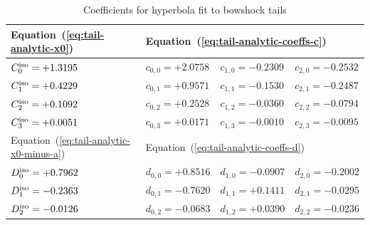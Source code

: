 \begin{table}
  \caption{Coefficients for hyperbola fit to bowshock tails}
  \label{tab:tail-fit-coeffs}
  \renewcommand\arraystretch{1.2}
  \setlength\tabcolsep{0.5\tabcolsep}
  \begin{tabular}{@{}llll@{}}
    \toprule
    Equation~(\ref{eq:tail-analytic-x0}) & 
    \multicolumn{3}{l}{
    Equation~(\ref{eq:tail-analytic-coeffs-c}) \dotfill
    } \\ \midrule
    \( C^{\mathrm{iso}}_0 = +1.3195     \)    
    & \( c_{0,0} = +2.0758   \)  
    & \( c_{1,0} = -0.2309   \)  
    & \( c_{2,0} = -0.2532   \)\\
      \( C^{\mathrm{iso}}_1 = +0.4229     \)    
    & \( c_{0,1} = +0.9571   \)  
    & \( c_{1,1} = -0.1530   \)  
    & \( c_{2,1} = -0.2487   \)\\
      \( C^{\mathrm{iso}}_2 = +0.1092     \)    
    & \( c_{0,2} = +0.2528   \)  
    & \( c_{1,2} = -0.0360   \)  
    & \( c_{2,2} = -0.0794   \)\\
      \( C^{\mathrm{iso}}_3 = +0.0051     \)    
    & \( c_{0,3} = +0.0171   \)  
    & \( c_{1,3} = -0.0010   \)  
    & \( c_{2,3} = -0.0095   \)\\ \midrule
    Equation~(\ref{eq:tail-analytic-x0-minus-a}) &
    \multicolumn{3}{l}{
    Equation~(\ref{eq:tail-analytic-coeffs-d}) \dotfill
    } \\ \midrule
    \( D^{\mathrm{iso}}_0 = +0.7962   \)    
    & \( d_{0,0} = +0.8516 \)  
    & \( d_{1,0} = -0.0907 \)  
    & \( d_{2,0} = -0.2002 \)\\
      \( D^{\mathrm{iso}}_1 = -0.2363   \)    
    & \( d_{0,1} = -0.7620 \)  
    & \( d_{1,1} = +0.1411 \)  
    & \( d_{2,1} = -0.0295 \)\\
      \( D^{\mathrm{iso}}_2 = -0.0126   \)    
    & \( d_{0,2} = -0.0683 \)  
    & \( d_{1,2} = +0.0390 \)  
    & \( d_{2,2} = -0.0236 \)\\
    \bottomrule
  \end{tabular}
\end{table}





